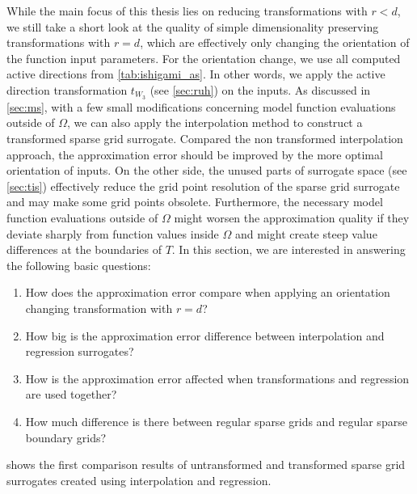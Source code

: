 \documentclass[
  a4paper,  %
  twoside,  %
  bibliography=totoc,
  headsepline,
  cleardoublepage=empty,
  parskip=half,
  draft=false
]{scrbook}
\begin{document}
While the main focus of this thesis lies on reducing transformations with $r < d$, we still take a short look at the quality of simple dimensionality preserving transformations with $r=d$, which are effectively only changing the orientation of the function input parameters.
For the orientation change, we use all computed active directions from \cref{tab:ishigami_as}.
In other words, we apply the active direction transformation $t_{W_3}$ (see \cref{sec:ruh}) on the inputs.
As discussed in \cref{sec:ms}, with a few small modifications concerning model function evaluations outside of $\Omega$, we can also apply the interpolation method to construct a transformed sparse grid surrogate.
Compared the non transformed interpolation approach, the approximation error should be improved by the more optimal orientation of inputs.
On the other side, the unused parts of surrogate space (see \cref{sec:tis}) effectively reduce the grid point resolution of the sparse grid surrogate and may make some grid points obsolete.
Furthermore, the necessary model function evaluations outside of $\Omega$ might worsen the approximation quality if they deviate sharply from function values inside $\Omega$ and might create steep value differences at the boundaries of $T$.
In this section, we are interested in answering the following basic questions:
\begin{enumerate}
\item How does the approximation error compare when applying an orientation changing transformation with $r=d$?
\item How big is the approximation error difference between interpolation and regression surrogates?
\item How is the approximation error affected when transformations and regression are used together?
\item How much difference is there between regular sparse grids and regular sparse boundary grids?
\end{enumerate}
 shows the first comparison results of untransformed and transformed sparse grid surrogates created using interpolation and regression.
\end{document}
